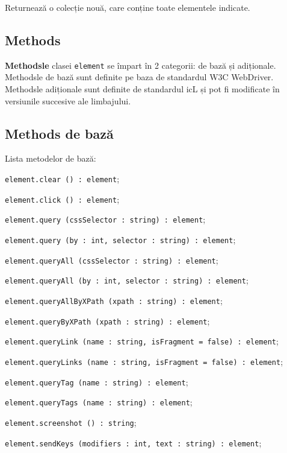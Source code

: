 Returnează o colecție nouă, care conține toate elementele indicate.

\subsection{Methods}

{\bf Methodsle} clasei \texttt{element} se împart în 2 categorii: de bază și adiționale. Methodsle de bază sunt definite pe baza de standardul W3C WebDriver. Methodsle adiționale sunt definite de standardul icL și pot fi modificate în versiunile succesive ale limbajului.

\subsection{Methods de bază}

Lista metodelor de bază:
\begin{icItems}
\item \texttt{element.clear () : element};
\item \texttt{element.click () : element};
\item \texttt{element.query (cssSelector : string) : element};
\item \texttt{element.query (by : int, selector : string) : element};
\item \texttt{element.queryAll (cssSelector : string) : element};
\item \texttt{element.queryAll (by : int, selector : string) : element};
\item \texttt{element.queryAllByXPath (xpath : string) : element};
\item \texttt{element.queryByXPath (xpath : string) : element};
\item \texttt{element.queryLink (name : string, isFragment = false) : element};
\item \texttt{element.queryLinks (name : string, isFragment = false) : element};
\item \texttt{element.queryTag (name : string) : element};
\item \texttt{element.queryTags (name : string) : element};
\item \texttt{element.screenshot () : string};
\item \texttt{element.sendKeys (modifiers : int, text : string) : element};
\end{icItems}

